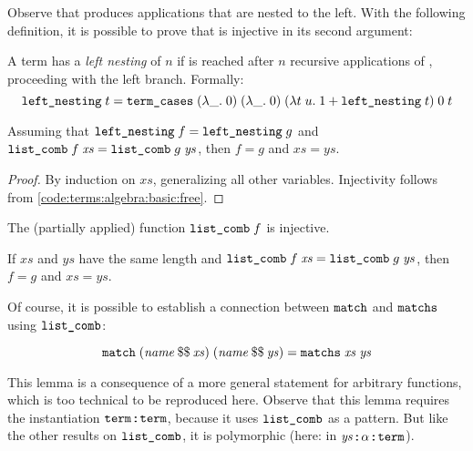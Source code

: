 \noindent
Observe that  produces applications that are nested to the left.
With the following definition, it is possible to prove that  is injective in its second argument:
%
\begin{definition}
  A term has a \emph{left nesting} of $n$ if  is reached after $n$ recursive applications of , proceeding with the left branch.
  Formally:
  \[
    \texttt{\textup{left\_nesting}}\;t = \texttt{\textup{term\_cases}}\;(\lambda\_.\;0)\;(\lambda\_.\;0)\;(\lambda t\;u.\;1 + \texttt{\textup{left\_nesting}}\;t)\;0\;t
  \]
\end{definition}
%
\begin{lemma}
  Assuming that $\texttt{\textup{left\_nesting}}\;f = \texttt{\textup{left\_nesting}}\;g$ and $\texttt{\textup{list\_comb}}\;f\;\mathit{xs} = \texttt{\textup{list\_comb}}\;g\;\mathit{ys}$, then $f = g$ and $\mathit{xs} = \mathit{ys}$.
\end{lemma}
%
\begin{proof}
  By induction on $\mathit{xs}$, generalizing all other variables.
  Injectivity follows from \cref{code:terms:algebra:basic:free}.
\end{proof}
%
\begin{corollary}[Injectivity]\label{thm:terms:algebra:inj}
  The (partially applied) function $\texttt{\textup{list\_comb}}\;f$ is injective.
\end{corollary}
%
\begin{corollary}\label{thm:terms:algebra:semi-inj}
  If $\mathit{xs}$ and $\mathit{ys}$ have the same length and $\texttt{\textup{list\_comb}}\;f\;\mathit{xs} = \texttt{\textup{list\_comb}}\;g\;\mathit{ys}$, then $f = g$ and $\mathit{xs} = \mathit{ys}$.
\end{corollary}

\noindent
Of course, it is possible to establish a connection between $\texttt{\textup{match}}$ and $\texttt{\textup{matchs}}$ using $\texttt{\textup{list\_comb}}$:
%
\begin{lemma}\label{thm:terms:algebra:match-matchs}
  \[ \texttt{\textup{match}}\;(\mathit{name}\mathbin{\$\$}\mathit{xs})\;(\mathit{name}\mathbin{\$\$}\mathit{ys}) = \texttt{\textup{matchs}}\;\mathit{xs}\;\mathit{ys} \]
\end{lemma}

\noindent
This lemma is a consequence of a more general statement for arbitrary functions, which is too technical to be reproduced here.
Observe that this lemma requires the instantiation $\texttt{\textup{term}} \mathbin{:\!\!:} \texttt{\textup{term}}$, because it uses $\texttt{\textup{list\_comb}}$ as a pattern.
But like the other results on $\texttt{\textup{list\_comb}}$, it is polymorphic (here: in $\mathit{ys} \mathbin{:\!\!:} \alpha \mathbin{:\!\!:} \texttt{\textup{term}}$).

